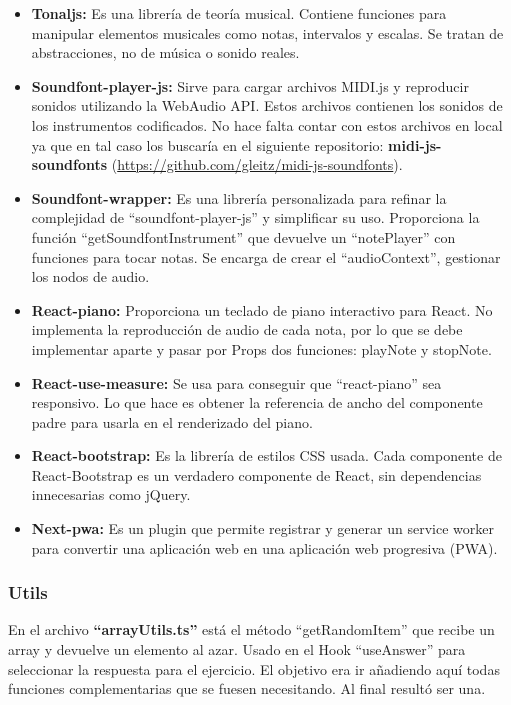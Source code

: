 \documentclass[12pt,twoside,titlepage]{report}
\begin{document}
\begin{itemize}
    \item \textbf{Tonaljs:} Es una librería de teoría musical. Contiene funciones para manipular elementos musicales como notas, intervalos y escalas. Se tratan de abstracciones, no de música o sonido reales.
    \item \textbf{Soundfont-player-js:} Sirve para cargar archivos MIDI.js y reproducir sonidos utilizando la WebAudio API. Estos archivos contienen los sonidos de los instrumentos codificados. No hace falta contar con estos archivos en local ya que en tal caso los buscaría en el siguiente repositorio: \textbf{midi-js-soundfonts} (\url{https://github.com/gleitz/midi-js-soundfonts}).
    \item \textbf{Soundfont-wrapper:} Es una librería personalizada para refinar la complejidad de ``soundfont-player-js'' y simplificar su uso. Proporciona la función ``getSoundfontInstrument'' que devuelve un ``notePlayer'' con funciones para tocar notas. Se encarga de crear el ``audioContext'', gestionar los nodos de audio.
    \item \textbf{React-piano:} Proporciona un teclado de piano interactivo para React. No implementa la reproducción de audio de cada nota, por lo que se debe implementar aparte y pasar por Props dos funciones: playNote y stopNote.
    \item \textbf{React-use-measure:} Se usa para conseguir que ``react-piano'' sea responsivo. Lo que hace es obtener la referencia de ancho del componente padre para usarla en el renderizado del piano.
    \item \textbf{React-bootstrap:} Es la librería de estilos CSS usada. Cada componente de React-Bootstrap es un verdadero componente de React, sin dependencias innecesarias como jQuery.
    \item \textbf{Next-pwa:} Es un plugin que permite registrar y generar un service worker para convertir una aplicación web en una aplicación web progresiva (PWA).
\end{itemize}

\subsubsection{Utils}
En el archivo \textbf{``arrayUtils.ts''} está el método ``getRandomItem'' que recibe un array y devuelve un elemento al azar. Usado en el Hook ``useAnswer'' para seleccionar la respuesta para el ejercicio. El objetivo era ir añadiendo aquí todas funciones complementarias que se fuesen necesitando. Al final resultó ser una.
\end{document}
